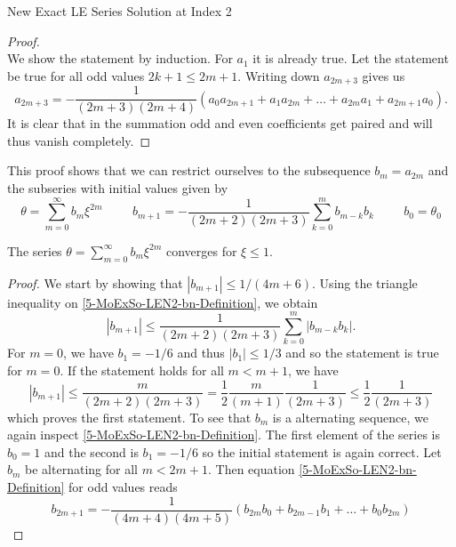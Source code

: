 \begin{appendix}
\begin{section}
\begin{subsection}{New Exact LE Series Solution at Index 2}
\begin{proof}
\begin{equation}
		\label{5-MoExSo-LEN2-Recursive-Coefficients}
	\end{equation}
	We show the statement by induction. For $a_1$ it is already true. Let the statement be true 
	for all odd values $2k+1\leq2m+1$. Writing down $a_{2m+3}$ gives us
	\begin{equation}
		a_{2m+3} = -\frac{1}{(2m+3)(2m+4)}\left(a_0a_{2m+1}+a_1a_{2m}+\dots+a_{2m}a_1+a_{2m+1}a_0\right).
	\end{equation}
	It is clear that in the summation odd and even coefficients get paired and will thus 
	vanish completely.
\end{proof}\noindent
This proof shows that we can restrict ourselves to the subsequence $b_m=a_{2m}$ and 
the subseries with initial values given by
\begin{equation}
	\theta = \sum\limits_{m=0}^\infty b_m\xi^{2m} \hspace{1cm} b_{m+1} = 
	-\frac{1}{(2m+2)(2m+3)}\sum\limits_{k=0}^mb_{m-k}b_k \hspace{1cm} b_0=\theta_0
	\label{5-MoExSo-LEN2-bn-Definition}
\end{equation}
\begin{theorem}
	The series $\theta=\sum\limits_{m=0}^\infty b_m\xi^{2m}$ converges for $\xi\leq1$.
\end{theorem}
\begin{proof}
	We start by showing that $|b_{m+1}|\leq1/(4m+6)$. Using the triangle inequality on 
	\ref{5-MoExSo-LEN2-bn-Definition}, we obtain
	\begin{equation}
		|b_{m+1}| \leq \frac{1}{(2m+2)(2m+3)}\sum\limits_{k=0}^m|b_{m-k}b_k|.
	\end{equation}
	For $m=0$, we have $b_1=-1/6$ and thus $|b_1|\leq1/3$ and so the statement is true for $m=0$.
	If the statement holds for all $m<m+1$, we have
	\begin{equation}
		|b_{m+1}| \leq \frac{m}{(2m+2)(2m+3)} = \frac{1}{2}\frac{m}{(m+1)}\frac{1}{(2m+3)}
		\leq\frac{1}{2}\frac{1}{(2m+3)}
	\end{equation}
	which proves the first statement. To see that $b_m$ is a alternating sequence, we again inspect
	\ref{5-MoExSo-LEN2-bn-Definition}. The first element of the series is 
	$b_0=1$ and the second is $b_1=-1/6$ so the initial statement is again correct. Let $b_m$ be 
	alternating for all $m<2m+1$. Then equation \ref{5-MoExSo-LEN2-bn-Definition} for odd values reads
	\begin{equation}
		b_{2m+1} = -\frac{1}{(4m+4)(4m+5)}\left(b_{2m}b_0+b_{2m-1}b_1+\dots+b_0b_{2m}\right)

\end{equation}
\end{proof}
\end{subsection}
\end{section}
\end{appendix}
